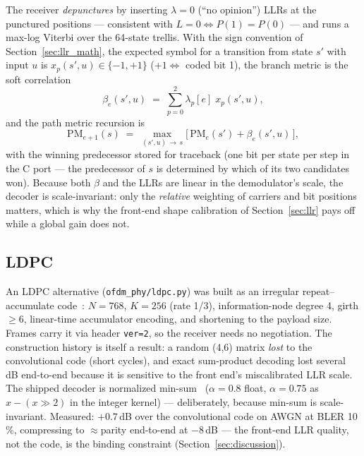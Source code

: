 The receiver \emph{depunctures} by inserting $\lambda = 0$ (``no
opinion'') LLRs at the punctured positions --- consistent with
$L=0 \Leftrightarrow P(1)=P(0)$ --- and runs a max-log Viterbi over
the 64-state trellis.  With the sign convention of
Section~\ref{sec:llr_math}, the expected symbol for a transition from
state $s'$ with input $u$ is $x_p(s',u) \in \{-1,+1\}$
($+1 \Leftrightarrow$ coded bit 1), the branch metric is the soft
correlation
\begin{equation}
    \beta_e(s', u) \;=\; \sum_{p=0}^{2} \lambda_p[e]\; x_p(s', u),
\end{equation}
and the path metric recursion is
\begin{equation}
    \mathrm{PM}_{e+1}(s) \;=\;
    \max_{(s', u)\,\rightarrow\, s}
    \bigl[\, \mathrm{PM}_e(s') + \beta_e(s', u) \,\bigr],
\end{equation}
with the winning predecessor stored for traceback (one bit per state
per step in the C port --- the predecessor of $s$ is determined by
which of its two candidates won).  Because both $\beta$ and the LLRs
are linear in the demodulator's scale, the decoder is scale-invariant:
only the \emph{relative} weighting of carriers and bit positions
matters, which is why the front-end shape calibration of
Section~\ref{sec:llr} pays off while a global gain does not.

\subsection{LDPC}

An LDPC alternative (\texttt{ofdm\_phy/ldpc.py}) was built as an
irregular repeat--accumulate code~\cite{jin2000ira}: $N=768$, $K=256$
(rate 1/3), information-node degree 4, girth $\ge 6$, linear-time
accumulator encoding, and shortening to the payload size.  Frames carry
it via header \texttt{ver=2}, so the receiver needs no negotiation.
The construction history is itself a result: a random (4,6) matrix
\emph{lost} to the convolutional code (short cycles), and exact
sum-product decoding lost several dB end-to-end because it is
sensitive to the front end's miscalibrated LLR scale.  The shipped
decoder is normalized min-sum~\cite{chen2005minsum}
($\alpha = 0.8$ float, $\alpha = 0.75$ as $x - (x \!\gg\! 2)$ in the
integer kernel) --- deliberately, because min-sum is scale-invariant.
Measured: $+0.7$\,dB over the convolutional code on AWGN at BLER
10\,\%, compressing to $\approx$parity end-to-end at $-8$\,dB ---
the front-end LLR quality, not the code, is the binding constraint
(Section~\ref{sec:discussion}).

